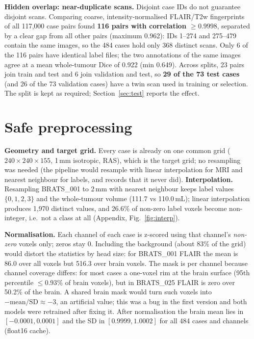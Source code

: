 \documentclass[10pt,a4paper]{article}
\newcommand{\mL}{\,mL}
\newcommand{\mm}{\,mm}
\begin{document}
\textbf{Hidden overlap: near-duplicate scans.} Disjoint case IDs do not guarantee disjoint scans. Comparing coarse, intensity-normalised FLAIR/T2w fingerprints of all 117{,}000 case pairs found \textbf{116 pairs with correlation $\geq 0.9998$}, separated by a clear gap from all other pairs (maximum 0.962): IDs 1--274 and 275--479 contain the same images, so the 484 cases hold only 368 distinct scans. Only 6 of the 116 pairs have identical label files; the two annotations of the same images agree at a mean whole-tumour Dice of 0.922 (min 0.649). Across splits, 23 pairs join train and test and 6 join validation and test, so \textbf{29 of the 73 test cases} (and 26 of the 73 validation cases) have a twin scan used in training or selection. The split is kept as required; Section~\ref{sec:test} reports the effect.

\section{Safe preprocessing}
\textbf{Geometry and target grid.} Every case is already on one common grid ($240\times240\times155$, 1\mm{} isotropic, RAS), which is the target grid; no resampling was needed (the pipeline would resample with linear interpolation for MRI and nearest neighbour for labels, and records that it never did). \textbf{Interpolation.} Resampling BRATS\_001 to 2\mm{} with nearest neighbour keeps label values $\{0,1,2,3\}$ and the whole-tumour volume (111.7 vs 110.0\mL); linear interpolation produces 1{,}970 distinct values, and 26.6\% of non-zero label voxels become non-integer, i.e.\ not a class at all (Appendix, Fig.~\ref{fig:interp}).

\textbf{Normalisation.} Each channel of each case is z-scored using that channel's \emph{non-zero} voxels only; zeros stay 0. Including the background (about 83\% of the grid) would distort the statistics by head size: for BRATS\_001 FLAIR the mean is 86.0 over all voxels but 516.3 over brain voxels. The mask is per channel because channel coverage differs: for most cases a one-voxel rim at the brain surface (95th percentile $\leq 0.93$\% of brain voxels), but in BRATS\_025 FLAIR is zero over 50.2\% of the brain. A shared brain mask would turn such voxels into $-\text{mean}/\text{SD}\approx-3$, an artificial value; this was a bug in the first version and both models were retrained after fixing it. After normalisation the brain mean lies in $[-0.0001, 0.0001]$ and the SD in $[0.9999, 1.0002]$ for all 484 cases and channels (float16 cache).
\end{document}
